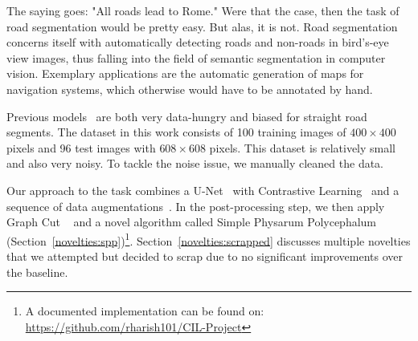 The saying goes: "All roads lead to Rome." Were that the case, then the task of road segmentation would be pretty easy. But alas, it is not. Road segmentation concerns itself with automatically detecting roads and non-roads in bird's-eye view images, thus falling into the field of semantic segmentation in computer vision. Exemplary applications are the automatic generation of maps for navigation systems, which otherwise would have to be annotated by hand.

Previous models~\cite{bastani2018roadtracer, mattyus2017deeproadmapper, kaiser2017learning} are both very data-hungry and biased for straight road segments. The dataset in this work consists of 100 training images of $400 \times 400$ pixels and 96 test images with $608 \times 608$ pixels. This dataset is relatively small and also very noisy. To tackle the noise issue, we manually cleaned the data.

Our approach to the task combines a U-Net~\cite{unet} with Contrastive Learning~\cite{chopra2005learning} and a sequence of data augmentations~\cite{lecun1998gradient}.
In the post-processing step, we then apply Graph Cut ~\cite{graphcut} and a novel algorithm called Simple Physarum Polycephalum (Section~\ref{novelties:spp})\footnote{A documented implementation can be found on: \href{https://github.com/rharish101/CIL-Project}{https://github.com/rharish101/CIL-Project}}.
Section~\ref{novelties:scrapped} discusses multiple novelties that we attempted but decided to scrap due to no significant improvements over the baseline.
